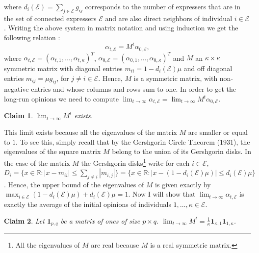 \documentclass{article}
\newtheorem{claim}{Claim}
\begin{document}
\noindent where $d_i (\mathcal{E}) = \sum_{j \in \mathcal{E}} g_{ij}$ corresponds to the number of expressers that are in the set of connected expressers $\mathcal{E}$ and are also direct neighbors of individual $i \in \mathcal{E}$. Writing the above system in matrix notation and using induction we get the following relation : $$\alpha_{t, \mathcal{E}} = M^t \alpha_{0, \mathcal{E}},$$ where $\alpha_{t, \mathcal{E}} = (\alpha_{t,1} , \ldots , \alpha_{t,\kappa})^{T}$,  $\alpha_{0, \mathcal{E}} = (\alpha_{0,1} , \ldots , \alpha_{0,\kappa})^{T}$ and $M$ an $\kappa \times \kappa$ symmetric matrix with diagonal entries $m_{ii} = 1 -  d_i (\mathcal{E}) \mu$ and off diagonal entries $m_{ij} = \mu g_{ij} $, for $j \neq i \in \mathcal{E}$. Hence, $M$ is a symmetric matrix, with non-negative entries and whose columns and rows sum to one. In order to get the long-run opinions we need to compute $\lim_{t \rightarrow \infty} \alpha_{t, \mathcal{E}} = \lim_{t \rightarrow \infty} M^t  \alpha_{0, \mathcal{E}} $. 
\begin{claim} $\lim_{t \rightarrow \infty} M^t$ exists. 
\end{claim}
This limit exists because all the eigenvalues of the matrix $M$ are smaller or equal to $1$. To see this, simply recall that by the Gershgorin Circle Theorem (1931), the eigenvalues of the square matrix $M$ belong to the union of its Gershgorin disks. In the case of the matrix $M$ the Gershgorin disks\footnote{All the eigenvalues of $M$ are real because $M$ is a real symmetric matrix.} write for each $i \in \mathcal{E}$, $D_i = \{ x \in \mathbb{R} : |x - m_{ii} | \leq \sum_{j \neq i } | m_{i,j}| \} = \{ x \in \mathbb{R} : |x - (1 - d_i (\mathcal{E}) \mu) | \leq d_i (\mathcal{E}) \mu  \}$. Hence, the upper bound of the eigenvalues of $M$ is given exactly by $\max_{i \in \mathcal{E}} (1 - d_i (\mathcal{E}) \mu) + d_i (\mathcal{E}) \mu = 1$. Now I will show that  $\lim_{t \rightarrow \infty} \alpha_{t, \mathcal{E}}$ is exactly the average of the initial opinions of individuals $1, \ldots , \kappa \in \mathcal{E}$.
\begin{claim} Let $\mathbf{1}_{p,q}$ be a matrix of ones of size $p \times q$. $\lim_{t \rightarrow \infty} M^t = \frac{1}{\kappa} \mathbf{1}_{\kappa,1} \mathbf{1}_{1,\kappa}$.  
\end{claim}
\end{document}
